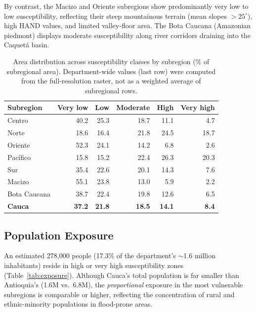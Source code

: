 \documentclass{article}
\begin{document}
By contrast, the Macizo and Oriente subregions show predominantly very low to low susceptibility, reflecting their steep mountainous terrain (mean slopes $> 25^{\circ}$), high HAND values, and limited valley-floor area. The Bota Caucana (Amazonian piedmont) displays moderate susceptibility along river corridors draining into the Caquet\'a basin.

\begin{table}[htbp]
\caption{Area distribution across susceptibility classes by subregion (\% of subregional area). Department-wide values (last row) were computed from the full-resolution raster, not as a weighted average of subregional rows.}
\label{tab:suscept_area}
\centering
\footnotesize
\begin{tabular}{lrrrrr}
\toprule
\textbf{Subregion} & \textbf{Very low} & \textbf{Low} & \textbf{Moderate} & \textbf{High} & \textbf{Very high} \\
\midrule
Centro              & 40.2 & 25.3 & 18.7 & 11.1 & 4.7 \\
Norte               & 18.6 & 16.4 & 21.8 & 24.5 & 18.7 \\
Oriente             & 52.3 & 24.1 & 14.2 & 6.8 & 2.6 \\
Pac\'ifico          & 15.8 & 15.2 & 22.4 & 26.3 & 20.3 \\
Sur                 & 35.4 & 22.6 & 20.1 & 14.3 & 7.6 \\
Macizo              & 55.1 & 23.8 & 13.0 & 5.9 & 2.2 \\
Bota Caucana        & 38.7 & 22.4 & 19.8 & 12.6 & 6.5 \\
\midrule
\textbf{Cauca}      & \textbf{37.2} & \textbf{21.8} & \textbf{18.5} & \textbf{14.1} & \textbf{8.4} \\
\bottomrule
\end{tabular}
\end{table}

\subsection{Population Exposure}

An estimated 278,000 people (17.3\% of the department's $\sim$1.6 million inhabitants) reside in high or very high susceptibility zones (Table~\ref{tab:exposure}). Although Cauca's total population is far smaller than Antioquia's (1.6M vs.\ 6.8M), the \textit{proportional} exposure in the most vulnerable subregions is comparable or higher, reflecting the concentration of rural and ethnic-minority populations in flood-prone areas.
\end{document}
